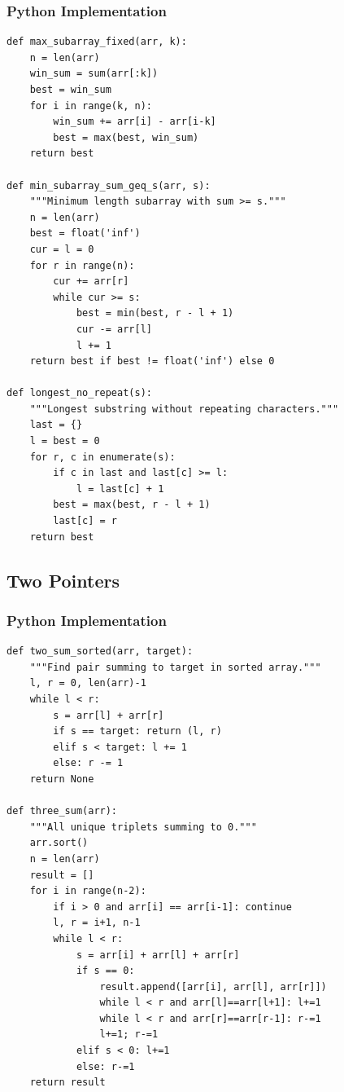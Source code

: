 \documentclass[10pt,a4paper]{article}
\theoremstyle{cpstyle}
\begin{document}
\subsubsection{Python Implementation}
\begin{lstlisting}[caption={Sliding Window -- maximum subarray sum of length k}]
def max_subarray_fixed(arr, k):
    n = len(arr)
    win_sum = sum(arr[:k])
    best = win_sum
    for i in range(k, n):
        win_sum += arr[i] - arr[i-k]
        best = max(best, win_sum)
    return best

def min_subarray_sum_geq_s(arr, s):
    """Minimum length subarray with sum >= s."""
    n = len(arr)
    best = float('inf')
    cur = l = 0
    for r in range(n):
        cur += arr[r]
        while cur >= s:
            best = min(best, r - l + 1)
            cur -= arr[l]
            l += 1
    return best if best != float('inf') else 0

def longest_no_repeat(s):
    """Longest substring without repeating characters."""
    last = {}
    l = best = 0
    for r, c in enumerate(s):
        if c in last and last[c] >= l:
            l = last[c] + 1
        best = max(best, r - l + 1)
        last[c] = r
    return best
\end{lstlisting}

\subsection{Two Pointers}

\subsubsection{Python Implementation}
\begin{lstlisting}[caption={Two Pointers -- pair sum, three sum}]
def two_sum_sorted(arr, target):
    """Find pair summing to target in sorted array."""
    l, r = 0, len(arr)-1
    while l < r:
        s = arr[l] + arr[r]
        if s == target: return (l, r)
        elif s < target: l += 1
        else: r -= 1
    return None

def three_sum(arr):
    """All unique triplets summing to 0."""
    arr.sort()
    n = len(arr)
    result = []
    for i in range(n-2):
        if i > 0 and arr[i] == arr[i-1]: continue
        l, r = i+1, n-1
        while l < r:
            s = arr[i] + arr[l] + arr[r]
            if s == 0:
                result.append([arr[i], arr[l], arr[r]])
                while l < r and arr[l]==arr[l+1]: l+=1
                while l < r and arr[r]==arr[r-1]: r-=1
                l+=1; r-=1
            elif s < 0: l+=1
            else: r-=1
    return result
\end{lstlisting}
\end{document}
